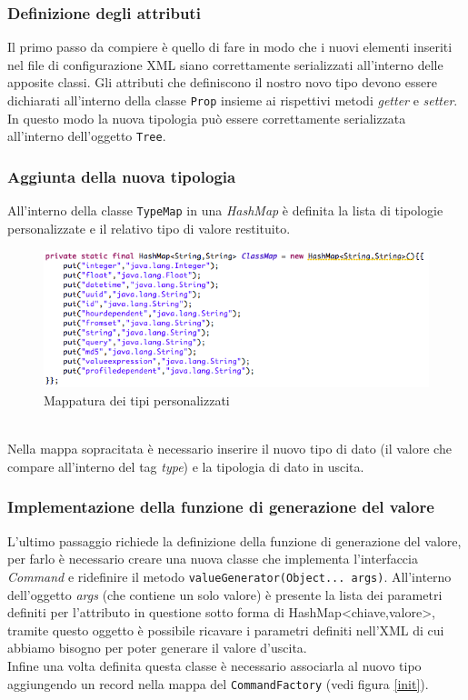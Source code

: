 \documentclass[12pt,a4paper,italian]{article}
\begin{document}
 \subsubsection{Definizione degli attributi}
 Il primo passo da compiere è quello di fare in modo che i nuovi elementi inseriti nel file di configurazione XML siano correttamente serializzati all'interno delle apposite classi.
 Gli attributi che definiscono il nostro novo tipo devono essere dichiarati all'interno della classe \texttt{Prop} insieme ai rispettivi metodi \emph{getter} e \emph{setter}. In questo modo la nuova tipologia può essere correttamente serializzata all'interno dell'oggetto \texttt{Tree}.
 \subsubsection{Aggiunta della nuova tipologia}
 All'interno della classe \texttt{TypeMap} in una \emph{HashMap} è definita la lista di tipologie personalizzate e il relativo tipo di valore restituito.
  \begin{figure}[h!]
  	\centering
  	\includegraphics[height=4cm]{img/typemap.png}
  	\caption{Mappatura dei tipi personalizzati}\label{typeMap}
  \end{figure}
  \\
  Nella mappa sopracitata è necessario inserire il nuovo tipo di dato (il valore che compare all'interno del tag \emph{type}) e la tipologia di dato in uscita.\\
  \subsubsection{Implementazione della funzione di generazione del valore}
  L'ultimo passaggio richiede la definizione della funzione di generazione del valore, per farlo è necessario creare una nuova classe che implementa l'interfaccia \emph{Command} e ridefinire il metodo \texttt{valueGenerator(Object... args)}. All'interno dell'oggetto \emph{args} (che contiene un solo valore) è presente la lista dei parametri definiti per l'attributo in questione sotto forma di HashMap<chiave,valore>, tramite questo oggetto è possibile ricavare i parametri definiti nell'XML di cui abbiamo bisogno per poter generare il valore d'uscita.\\
  Infine una volta definita questa classe è necessario associarla al nuovo tipo aggiungendo un record nella mappa del \texttt{CommandFactory} (vedi figura \ref{init}).
\end{document}
